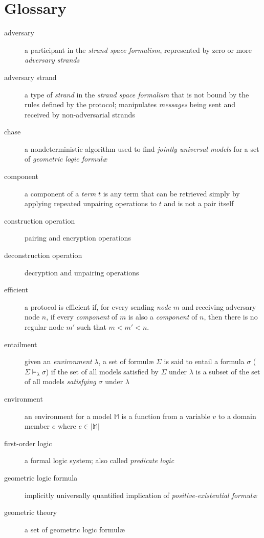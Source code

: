 \section{Glossary}
\label{sec:appendix_glossary}

	\begin{description}
		\item[adversary]
			a participant in the \emph{strand space formalism}, represented by
			zero or more \emph{adversary strands}
		\item[adversary strand]
			a type of \emph{strand} in the \emph{strand space formalism} that
			is not bound by the rules defined by the protocol; manipulates
			\emph{messages} being sent and received by non-adversarial strands
		\item[chase]
			a nondeterministic algorithm used to find \emph{jointly universal
			models} for a set of \emph{geometric logic formul{\ae}}
		\item[component]
			a component of a \emph{term} $t$ is any term that can be retrieved
			simply by applying repeated unpairing operations to $t$ and is not
			a pair itself
		\item[construction operation]
			pairing and encryption operations
		\item[deconstruction operation]
			decryption and unpairing operations
		\item[efficient]
			a protocol is efficient if, for every sending \emph{node} $m$ and
			receiving adversary node $n$, if every \emph{component} of $m$ is
			also a \emph{component} of $n$, then there is no regular node $m'$
			such that $m < m' < n$.
		\item[entailment]
			given an \emph{environment} $\lambda$, a set of formul{\ae}
			$\Sigma$ is said to entail a formula $\sigma$ ($\Sigma
			\models_\lambda \sigma$) if the set of all models satisfied
			by $\Sigma$ under $\lambda$ is a subset of the set of all models
			\emph{satisfying} $\sigma$ under $\lambda$
		\item[environment]
			an environment for a model $\mathbb{M}$ is a function from a
			variable $v$ to a domain member $e$ where $e \in |\mathbb{M}|$
		\item[first-order logic]
			a formal logic system; also called \emph{predicate logic}
		\item[geometric logic formula]
			implicitly universally quantified implication of
			\emph{positive-existential formul{\ae}}
		\item[geometric theory]
			a set of geometric logic formul{\ae}

\end{description}
